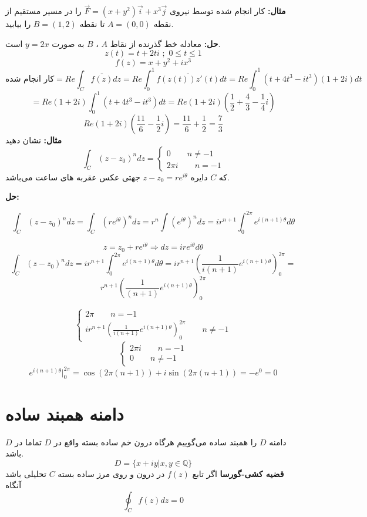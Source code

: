 \documentclass[12pt]{report}
\begin{document}
	\textbf{مثال:}
	کار انجام شده توسط نیروی
	$\vec{F} = (x+y^2) \vec{i} + x^3 \vec{j}$
	را در مسیر مستقیم از نقطه 
	$A = (0, 0)$
	تا نقطه 
	$B=(1, 2)$
	را بیابید.
	\newline
	
	\textbf{حل:}
	معادله خط گذرنده از نقاط 
	$A$
	،
	$B$
	به صورت 
	$y = 2x$
	است.
	$$z(t) = t + 2ti \,\,;\,\, 0 \leq t\leq 1$$
	$$f(z) = x + y^2 + ix^3$$
	$$\text{کار انجام شده} = Re\int_{C} \overline{f(z)} dz = Re\int_{0}^{1} \overline{f(z(t)) z'(t)} dt = Re\int_{0}^{1} (t + 4t^3 - it^3)(1 + 2i)dt$$
	$$=Re(1 + 2i)\int_{0}^{1} (t + 4t^3 - it^3)dt =Re(1 + 2i)(\frac{1}{2} + \frac{4}{3} - \frac{1}{4} i) $$
	$$Re(1 + 2i)(\frac{11}{6} - \frac{1}{2}i) = \frac{11}{6} + \frac{1}{2} = \frac{7}{3}$$
	\newline
	\textbf{مثال:}
	نشان دهید
	\[
	\int_{C}(z - z_0)^n dz = 
	\begin{cases}
		0 \qquad n \neq -1\\
		2\pi i \qquad n = -1
	\end{cases}
	\]
	که 
	$C$
	 دایره
	 $z - z_0 = re^{i\theta}$
	 جهتی عکس عقربه های ساعت می‌باشد.
	 \newline
	 
	 \textbf{حل:}
	 
	 $$\int_{C} (z-z_0)^n dz = \int_{C} (re^{i\theta})^n dz = r^n \int (e^{i\theta})^n dz = ir^{n+1} \int_{0}^{2\pi} e^{i(n+1)\theta} d\theta$$
	 
	 $$z = z_0 + re^{i\theta} \Rightarrow dz = ire^{i\theta}d\theta$$
	 $$\int_{C} (z-z_0)^n dz = ir^{n+1} \int_{0}^{2\pi} e^{i(n+1)\theta}d\theta = ir^{n+1}(\frac{1}{i(n+1)} e^{i(n+1)\theta})_{0}^{2\pi}=$$
	 $$r^{n+1}(\frac{1}{(n+1)} e^{i(n+1)\theta})_{0}^{2\pi}$$
	 
	 \[
	 \begin{cases}
	 	2\pi \qquad n = -1\\
	 	ir^{n+1}(\frac{1}{i(n+1)} e^{i(n+1)\theta})_{0}^{2\pi}\qquad n \neq -1
	 \end{cases}
	 \]
	 \[
	 \begin{cases}
	 	2\pi i \qquad n = -1\\
	 	0   \qquad n\neq -1
	 \end{cases}
	 \]
	 $$e^{i(n+1)\theta} \big|_{0}^{2\pi} = \cos(2\pi(n+1)) + i\sin(2\pi(n+1)) = -e^0 = 0$$
	 
	 \section{دامنه همبند ساده}
	 دامنه
	 $D$
	 را همبند ساده می‌گوییم هرگاه درون خم ساده بسته واقع در 
	 $D$
	 تماما در
	 $D$
	 باشد.
	 $$D= \{x + iy|x, y \in \mathbb{Q}\}$$
	 \newline
	 \textbf{قضیه کشی-گورسا}
	 اگر تابع
	 $f(z)$
	 در درون و روی مرز ساده بسته
	 $C$
	 تحلیلی باشد آنگاه
	 $$\oint_{C} f(z) dz = 0$$
	 \newline
	 
\end{document}
